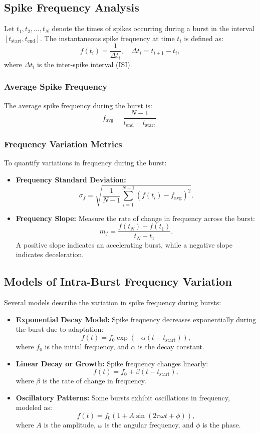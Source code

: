 \documentclass[a4paper,9pt]{extarticle}
\begin{document}
\subsection{Spike Frequency Analysis}
Let $t_1, t_2, \dots, t_N$ denote the times of spikes occurring during a burst in the interval $[t_{\text{start}}, t_{\text{end}}]$. The instantaneous spike frequency at time $t_i$ is defined as:
\[
f(t_i) = \frac{1}{\Delta t_i}, \quad \Delta t_i = t_{i+1} - t_i,
\]
where $\Delta t_i$ is the inter-spike interval (ISI).

\subsubsection{Average Spike Frequency}
The average spike frequency during the burst is:
\[
f_{\text{avg}} = \frac{N-1}{t_{\text{end}} - t_{\text{start}}}.
\]

\subsubsection{Frequency Variation Metrics}
To quantify variations in frequency during the burst:
\begin{itemize}
    \item \textbf{Frequency Standard Deviation:}
    \[
    \sigma_f = \sqrt{\frac{1}{N-1} \sum_{i=1}^{N-1} \left(f(t_i) - f_{\text{avg}}\right)^2}.
    \]
    \item \textbf{Frequency Slope:} Measure the rate of change in frequency across the burst:
    \[
    m_f = \frac{f(t_N) - f(t_1)}{t_N - t_1}.
    \]
    A positive slope indicates an accelerating burst, while a negative slope indicates deceleration.
\end{itemize}

\subsection{Models of Intra-Burst Frequency Variation}
Several models describe the variation in spike frequency during bursts:
\begin{itemize}
    \item \textbf{Exponential Decay Model:}
    Spike frequency decreases exponentially during the burst due to adaptation:
    \[
    f(t) = f_0 \exp(-\alpha (t - t_{\text{start}})),
    \]
    where $f_0$ is the initial frequency, and $\alpha$ is the decay constant.
    \item \textbf{Linear Decay or Growth:}
    Spike frequency changes linearly:
    \[
    f(t) = f_0 + \beta (t - t_{\text{start}}),
    \]
    where $\beta$ is the rate of change in frequency.
    \item \textbf{Oscillatory Patterns:}
    Some bursts exhibit oscillations in frequency, modeled as:
    \[
    f(t) = f_0 \left(1 + A \sin(2 \pi \omega t + \phi)\right),
    \]
    where $A$ is the amplitude, $\omega$ is the angular frequency, and $\phi$ is the phase.
\end{itemize}
\end{document}

